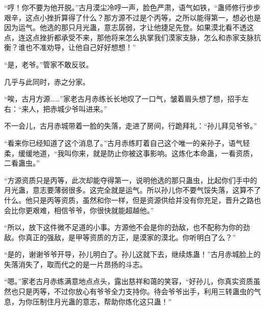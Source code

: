 \begin{this_body}
“哼！你不要为他开脱。”古月漠尘冷哼一声，脸色严肃，语气如铁，“蛊师修行步步艰辛，这点小挫折算得了什么？那方源不过是个丙等，之所以能得第一，想必也是因为运气。他选的那只月光蛊，意志孱弱，才让他捷足先登。如果漠北看不透这点，连这点挫折都承受不来，那他将来怎么执掌我们漠家支脉，怎么和赤家支脉抗衡？谁也不准劝导，让他自己好好想想！”

“是，老爷。”管家不敢反驳。

几乎与此同时，赤之分家。

“唉，古月方源……”家老古月赤练长长地叹了一口气，皱着眉头想了想，招手左右：“来人，把赤城少爷叫进来。”

不一会儿，古月赤城带着一脸的失落，走进了房间，行跪拜礼：“孙儿拜见爷爷。”

“看来你已经知道了这个消息了。”古月赤练盯着自己这个唯一的亲孙子，语气轻柔，缓缓地道，“我叫你来，就是防止你被这事影响。这炼化本命蛊，一看资质，二看蛊虫。”

“方源资质只是丙等，此次却能夺得第一，说明他选的那只蛊虫，比起你们手中的月光蛊，意志要薄弱很多。这完全就是运气。所以孙儿你不要气馁失落，这算不了什么。他只是丙等资质，虽然和你一样，但是资源供给并没有你充足，晋升之路也会比你更艰难，相信爷爷，你很快就能超越他。”

“所以，放下这件微不足道的小事。方源他不会是你的劲敌，也不配称为你的劲敌。你真正的强敌，是甲等资质的方正，是漠家的漠北。你听明白了么？”

“是的，谢谢爷爷开导，孙儿明白了。孙儿这就下去，继续炼蛊！”古月赤城脸上的失落消失了，取而代之的是一片昂扬的斗志。

“嗯。”家老古月赤练满意地点点头，露出慈祥和蔼的笑容，“好孙儿，你真实资质虽然也只是丙等，不过你放心有爷爷全力支持你。待会爷爷出手，利用三转蛊虫的气息，为你压制住月光蛊的意志，帮助你炼化这只蛊！”

\end{this_body}

